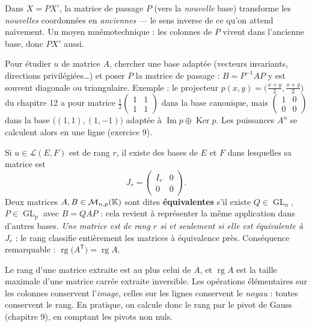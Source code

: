 \begin{attention}
Dans $X=PX'$, la matrice de passage $P$ (vers la \emph{nouvelle} base)
transforme les \emph{nouvelles} coordonnées en \emph{anciennes} — le sens
inverse de ce qu'on attend naïvement. Un moyen mnémotechnique : les
colonnes de $P$ vivent dans l'ancienne base, donc $PX'$ aussi.
\end{attention}

\begin{savoirfaire}
Pour étudier $u$ de matrice $A$, chercher une base adaptée (vecteurs
invariants, directions privilégiées…) et poser $P$ la matrice de passage :
$B=P^{-1}AP$ y est souvent diagonale ou triangulaire. Exemple : le
projecteur $p(x,y)=\bigl(\frac{x+y}{2},\frac{x+y}{2}\bigr)$ du chapitre 12
a pour matrice $\frac12\begin{pmatrix}1&1\\1&1\end{pmatrix}$ dans la base
canonique, mais $\begin{pmatrix}1&0\\0&0\end{pmatrix}$ dans la base
$\bigl((1,1),(1,-1)\bigr)$ adaptée à
$\operatorname{Im}p\oplus\operatorname{Ker}p$. Les puissances $A^{n}$ se
calculent alors en une ligne (exercice 9).
\end{savoirfaire}


\begin{theoreme}
Si $u\in\mathcal{L}(E,F)$ est de rang $r$, il existe des bases de $E$ et
$F$ dans lesquelles sa matrice est
\[
J_r=\begin{pmatrix}I_r&0\\0&0\end{pmatrix} .
\]
Deux matrices $A,B\in\mathcal{M}_{n,p}(\mathbb{K})$ sont dites
\textbf{équivalentes} s'il existe $Q\in\operatorname{GL}_n$,
$P\in\operatorname{GL}_p$ avec $B=QAP$ : cela revient à représenter la même
application dans d'autres bases. \emph{Une matrice est de rang $r$ si et
seulement si elle est équivalente à $J_r$} : le rang classifie entièrement
les matrices à équivalence près. Conséquence remarquable :
$\operatorname{rg}\bigl(A^{\mathsf T}\bigr)=\operatorname{rg}A$.
\end{theoreme}

\begin{propriete}
Le rang d'une matrice extraite est au plus celui de $A$, et
$\operatorname{rg}A$ est la taille maximale d'une matrice carrée extraite
inversible. Les opérations élémentaires sur les colonnes conservent
l'\emph{image}, celles sur les lignes conservent le \emph{noyau} : toutes
conservent le rang. En pratique, on calcule donc le rang par le pivot de
Gauss (chapitre 9), en comptant les pivots non nuls.
\end{propriete}

